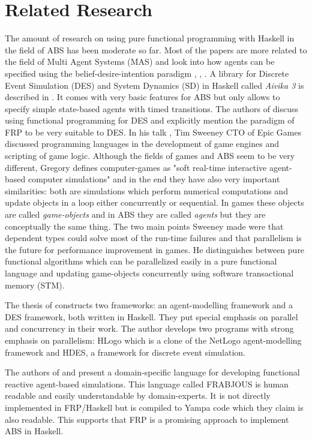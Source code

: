 \section{Related Research}
The amount of research on using pure functional programming with Haskell in the field of ABS has been moderate so far. Most of the papers are more related to the field of Multi Agent Systems (MAS) and look into how agents can be specified using the belief-desire-intention paradigm \cite{de_jong_suitability_2014}, \cite{sulzmann_specifying_2007}, \cite{jankovic_functional_2007}. A library for Discrete Event Simulation (DES) and System Dynamics (SD) in Haskell called \textit{Aivika 3} is described in \cite{sorokin_aivika_2015}. It comes with very basic features for ABS but only allows to specify simple state-based agents with timed transitions.
The authors of \cite{jankovic_functional_2007} discuss using functional programming for DES and explicitly mention the paradigm of FRP to be very suitable to DES. 
In his talk \cite{sweeney_next_2006}, Tim Sweeney CTO of Epic Games discussed programming languages in the development of game engines and scripting of game logic. Although the fields of games and ABS seem to be very different, Gregory \cite{gregory_game_2018} defines computer-games as "soft real-time interactive agent-based computer simulations" and in the end they have also very important similarities: both are simulations which perform numerical computations and update objects in a loop either concurrently or sequential. In games these objects are called \textit{game-objects} and in ABS they are called \textit{agents} but they are conceptually the same thing. The two main points Sweeney made were that dependent types could solve most of the run-time failures and that parallelism is the future for performance improvement in games. He distinguishes between pure functional algorithms which can be parallelized easily in a pure functional language and updating game-objects concurrently using software transactional memory (STM).

The thesis of \cite{bezirgiannis_improving_2013} constructs two frameworks: an agent-modelling framework and a DES framework, both written in Haskell. They put special emphasis on parallel and concurrency in their work. The author develops two programs with strong emphasis on parallelism: HLogo which is a clone of the NetLogo agent-modelling framework and HDES, a framework for discrete event simulation.

The authors of \cite{schneider_towards_2012} and \cite{vendrov_frabjous:_2014} present a domain-specific language for developing functional reactive agent-based simulations. This language called FRABJOUS is human readable and easily understandable by domain-experts. It is not directly implemented in FRP/Haskell but is compiled to Yampa code which they claim is also readable. This supports that FRP is a promising approach to implement ABS in Haskell.